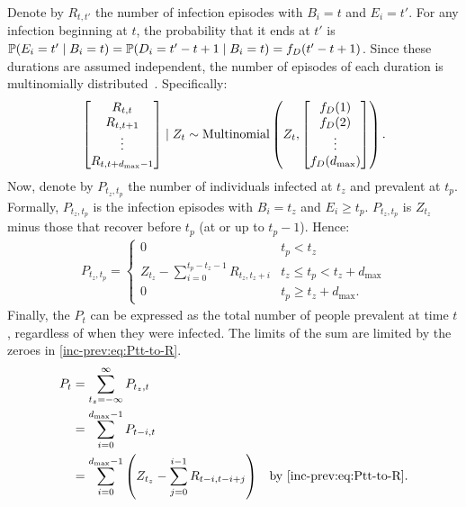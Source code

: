 \documentclass[thesis.tex]{subfiles}
\begin{document}
Denote by $R_{t,t'}$ the number of infection episodes with $B_i=t$ and $E_i=t'$.
For any infection beginning at $t$, the probability that it ends at $t'$ is $\operatorname{\mathbb{P}}(E_i = t' \mid B_i = t) = \operatorname{\mathbb{P}}(D_i = t' - t + 1 \mid B_i = t) = f_D(t' - t + 1)$.
Since these durations are assumed independent, the number of episodes of each duration is multinomially distributed~\autocite{paganoHIV}.
Specifically:
\begin{align}
\begin{bmatrix}
  R_{t,t} \\ R_{t,t+1} \\ \vdots \\ R_{t,t+d_\text{max}-1}
\end{bmatrix} \mid Z_t
\sim \operatorname{Multinomial} \left(
  Z_t, 
  \begin{bmatrix}
    f_D(1) \\ f_D(2) \\ \vdots \\ f_D(d_\text{max})
  \end{bmatrix}
\right).
\end{align}
Now, denote by $P_{t_z,t_p}$ the number of individuals infected at $t_z$ and prevalent at $t_p$.
Formally, $P_{t_z,t_p}$ is the infection episodes with $B_i = t_z$ and $E_i \geq t_p$.
$P_{t_z,t_p}$ is $Z_{t_z}$ minus those that recover before $t_p$ (\ie at or up to $t_p - 1$).
Hence:
\begin{align}
    P_{t_z,t_p} = \begin{cases}
      0 &t_p < t_z\\
      Z_{t_z} - \sum_{i=0}^{t_p-t_z-1} R_{t_z,t_z+i} &t_z \leq t_p < t_z + d_\text{max}\\
      0 &t_p \geq t_z + d_\text{max}.
  \end{cases} \label{inc-prev:eq:Ptt-to-R}
\end{align}
Finally, the $P_t$ can be expressed as the total number of people prevalent at time $t$, regardless of when they were infected.
The limits of the sum are limited by the zeroes in \cref{inc-prev:eq:Ptt-to-R}.
\begin{align}
  P_t
  &= \sum_{t_z=-\infty}^\infty P_{t_z,t} \\
  &= \sum_{i=0}^{\dmax-1} P_{t-i,t} \label{inc-prev:eq:Pt-to-Ptt} \\
  &= \sum_{i=0}^{\dmax-1} \left(Z_{t_z} - \sum_{j=0}^{i-1} R_{t-i,t-i+j} \right) &\text{by \cref{inc-prev:eq:Ptt-to-R}}\label{inc-prev:eq:Pt-to-Rtt}.
\end{align}
\end{document}
